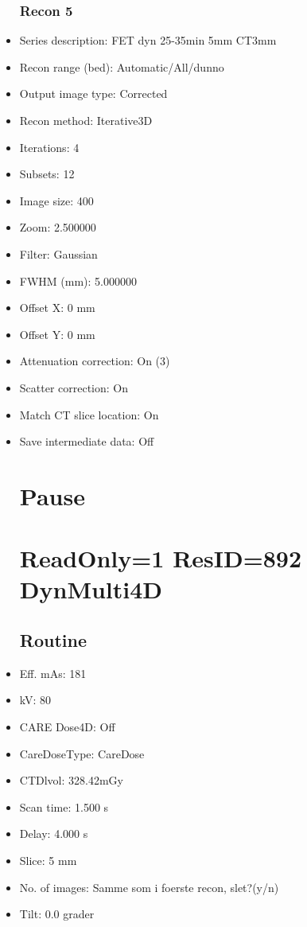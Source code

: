 \documentclass[12pt]{article}
\begin{document}
\begin{itemize}
\subsubsection{Recon 5}
\item Series description: FET dyn 25-35min 5mm CT3mm
\item Recon range (bed): Automatic/All/dunno
\item Output image type: Corrected
\item Recon method: Iterative3D
\item Iterations: 4
\item Subsets: 12
\item Image size: 400
\item Zoom: 2.500000
\item Filter: Gaussian
\item FWHM (mm): 5.000000
\item Offset X: 0 mm
\item Offset Y: 0 mm
\item Attenuation correction: On (3)
\item Scatter correction: On
\item Match CT slice location: On
\item Save intermediate data: Off
\section{Pause}

\section{ReadOnly=1 ResID=892 DynMulti4D}
\subsection{Routine}
\item Eff. mAs: 181\item kV: 80\item CARE Dose4D: Off\item CareDoseType: CareDose\item CTDlvol: 328.42mGy\item Scan time: 1.500 s\item Delay: 4.000 s\item Slice: 5 mm\item No. of images: Samme som i foerste recon, slet?(y/n)\item Tilt: 0.0 grader

\end{itemize}
\end{document}
